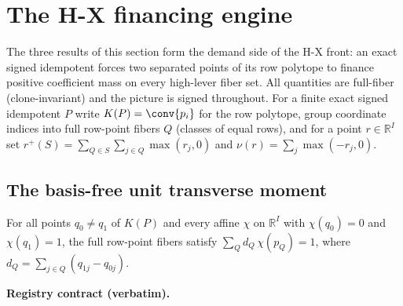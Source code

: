 \section{The H-X financing engine}\label{sec:hx-financing-engine}

The three results of this section form the demand side of the H-X front: an exact
signed idempotent forces two separated points of its row polytope to finance positive
coefficient mass on every high-lever fiber set. All quantities are full-fiber
(clone-invariant) and the picture is signed throughout. For a finite exact signed
idempotent $P$ write $K(P)=\conv\{p_i\}$ for the row polytope, group coordinate
indices into full row-point fibers $Q$ (classes of equal rows), and for a point
$r\in\mathbb R^I$ set $r^+(S)=\sum_{Q\in S}\sum_{j\in Q}\max(r_j,0)$ and
$\nu(r)=\sum_j\max(-r_j,0)$.

\subsection{The basis-free unit transverse moment}

\begin{lemma}\label{lem:hx-transverse-moment-identity}
For all points $q_0\ne q_1$ of $K(P)$ and every affine $\chi$ on $\mathbb R^I$ with
$\chi(q_0)=0$ and $\chi(q_1)=1$, the full row-point fibers satisfy
$\sum_Q d_Q\,\chi(p_Q)=1$, where $d_Q=\sum_{j\in Q}(q_{1j}-q_{0j})$.
\end{lemma}

\noindent\textbf{Registry contract (verbatim).}

